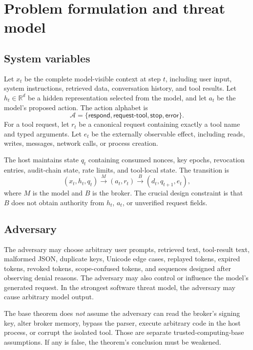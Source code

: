 \documentclass[11pt]{article}
\newcommand{\R}{\mathbb{R}}
\newcommand{\1}{\mathbf{1}}
\newcommand{\cA}{\mathcal{A}}
\begin{document}
\section{Problem formulation and threat model}

\subsection{System variables}
Let $x_t$ be the complete model-visible context at step $t$, including user input, system instructions, retrieved data, conversation history, and tool results. Let $h_t\in\R^d$ be a hidden representation selected from the model, and let $a_t$ be the model's proposed action. The action alphabet is
\[
  \cA = \{\textsf{respond},\textsf{request-tool},\textsf{stop},\textsf{error}\}.
\]
For a tool request, let $r_t$ be a canonical request containing exactly a tool name and typed arguments. Let $e_t$ be the externally observable effect, including reads, writes, messages, network calls, or process creation.

The host maintains state $q_t$ containing consumed nonces, key epochs, revocation entries, audit-chain state, rate limits, and tool-local state. The transition is
\begin{equation}
 (x_t,h_t,q_t) \xrightarrow{M} (a_t,r_t) \xrightarrow{B} (d_t,q_{t+1},e_t),
\end{equation}
where $M$ is the model and $B$ is the broker. The crucial design constraint is that $B$ does not obtain authority from $h_t$, $a_t$, or unverified request fields.

\subsection{Adversary}
The adversary may choose arbitrary user prompts, retrieved text, tool-result text, malformed JSON, duplicate keys, Unicode edge cases, replayed tokens, expired tokens, revoked tokens, scope-confused tokens, and sequences designed after observing denial reasons. The adversary may also control or influence the model's generated request. In the strongest software threat model, the adversary may cause arbitrary model output.

The base theorem does \emph{not} assume the adversary can read the broker's signing key, alter broker memory, bypass the parser, execute arbitrary code in the host process, or corrupt the isolated tool. Those are separate trusted-computing-base assumptions. If any is false, the theorem's conclusion must be weakened.
\end{document}
